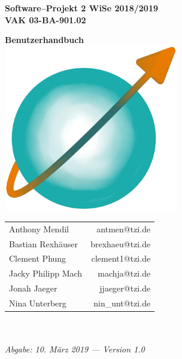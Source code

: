 \documentclass[enabledeprecatedfontcommands,fontsize=11pt,paper=a4,twoside]{scrartcl}
\begin{document}
  \thispagestyle{fancy}
  \fancyhead[LO,RE]{ }
  \fancyfoot[C]{}

  \vspace{3cm}

  \begin{minipage}[H]{\textwidth}
  \begin{center}
  \bf
  \Large
  Software--Projekt 2 WiSe 2018/2019\\
  \smallskip
  \small
  VAK 03-BA-901.02\\
  \vspace{3cm}
  \end{center}
  \end{minipage}
  \begin{minipage}[H]{\textwidth}
  \begin{center}
  \vspace{1cm}
  \bf
  \Large Benutzerhandbuch\\
  \vspace{2cm}
  \includegraphics[width=3.0in]{logo_graphit.png}

  
  \end{center}
 
  \end{minipage}
  \vfill
  \begin{minipage}[H]{\textwidth}
  \begin{center}
  \sf
  \begin{tabular}{lr}
  Anthony Mendil & antmen@tzi.de \\
  Bastian Rexhäuser & brexhaeu@tzi.de\\
  Clement Phung & clement1@tzi.de \\
  Jacky Philipp Mach & machja@tzi.de \\
  Jonah Jaeger & jjaeger@tzi.de \\
  Nina Unterberg & nin\_unt@tzi.de \\
  \end{tabular}
  \\ ~
  \vspace{2cm}
  \\
  \it Abgabe: 10. März 2019 --- Version 1.0\\ ~
  \end{center}
  \end{minipage}
\end{document}

